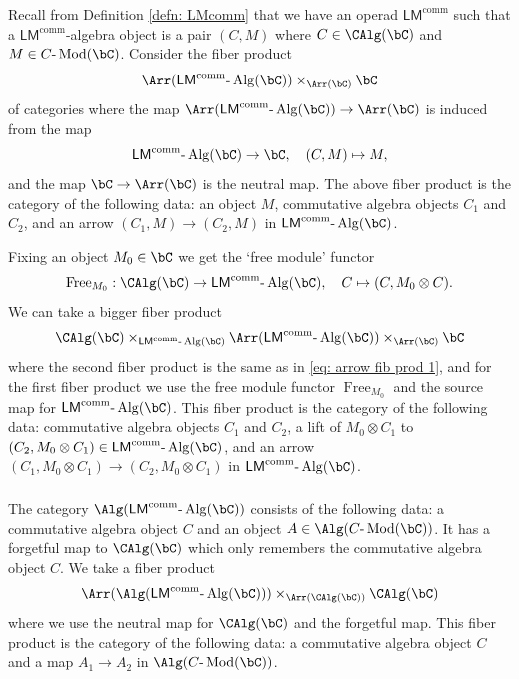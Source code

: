 \documentclass[10pt]{amsart}
\newcommand{\sssec}{\subsubsection}
\theoremstyle{remark}
\newcommand{\on}{\operatorname}
\newcommand{\lMod}{\text{-}\on{Mod}}
\newcommand{\lAlg}{\text{-}\on{Alg}}
\newcommand{\LMcomm}{\mathsf{LM}^{\on{comm}}}
\begin{document}
\sssec{}
Recall from Definition \ref{defn: LMcomm} that we have an operad $\LMcomm$ such that a $\LMcomm$-algebra object is a pair $(C,M)$ where $C\in\CAlg(\bC)$ and $M\in C\lMod(\bC)$. Consider the fiber product
\begin{equation}\label{eq: arrow fib prod 1}
    \Arr(\LMcomm\lAlg(\bC))\times_{\Arr(\bC)}\bC
\end{equation}
of categories where the map $\Arr(\LMcomm\lAlg(\bC))\rightarrow\Arr(\bC)$ is induced from the map 
\begin{equation}\label{eq: LMcomm forget to module}
    \LMcomm\lAlg(\bC)\rightarrow \bC,\quad (C,M)\mapsto M,
\end{equation}
and the map $\bC\rightarrow\Arr(\bC)$ is the neutral map. The above fiber product is the category of the following data: an object $M$, commutative algebra objects $C_1$ and $C_2$, and an arrow $(C_1,M)\rightarrow (C_2,M)$ in $\LMcomm\lAlg(\bC)$. 
\medskip

Fixing an object $M_0\in \bC$ we get the `free module' functor 
\begin{equation}\label{eq: free module functor LMcomm}
    \on{Free}_{M_0}:\CAlg(\bC)\rightarrow \LMcomm\lAlg(\bC),\quad C\mapsto (C,M_0\otimes C).
\end{equation}
We can take a bigger fiber product
\begin{equation}\label{eq: arrow fib prod 2}
    \CAlg(\bC)\times_{\LMcomm\lAlg(\bC)} \Arr(\LMcomm\lAlg(\bC))\times_{\Arr(\bC)}\bC
\end{equation}
where the second fiber product is the same as in \eqref{eq: arrow fib prod 1}, and for the first fiber product we use the free module functor $\on{Free}_{M_0}$ and the source map for $\LMcomm\lAlg(\bC)$. This fiber product is the category of the following data: commutative algebra objects $C_1$ and $C_2$, a lift of $M_0\otimes C_1$ to $(C_2, M_0\otimes C_1)\in\LMcomm\lAlg(\bC)$, and an arrow $(C_1, M_0\otimes C_1)\rightarrow (C_2, M_0\otimes C_1)$ in $\LMcomm\lAlg(\bC)$. 

\sssec{}
The category $\Alg(\LMcomm\lAlg(\bC))$ consists of the following data: a commutative algebra object $C$ and an object $A\in \Alg(C\lMod(\bC))$. It has a forgetful map to $\CAlg(\bC)$ which only remembers the commutative algebra object $C$. We take a fiber product
\begin{equation}\label{eq: arrow fib prod 3}
    \Arr(\Alg(\LMcomm\lAlg(\bC)))\times_{\Arr(\CAlg(\bC))}\CAlg(\bC)
\end{equation}
where we use the neutral map for $\CAlg(\bC)$ and the forgetful map. This fiber product is the category of the following data: a commutative algebra object $C$ and a map $A_1\rightarrow A_2$ in $\Alg(C\lMod(\bC))$.
\end{document}
